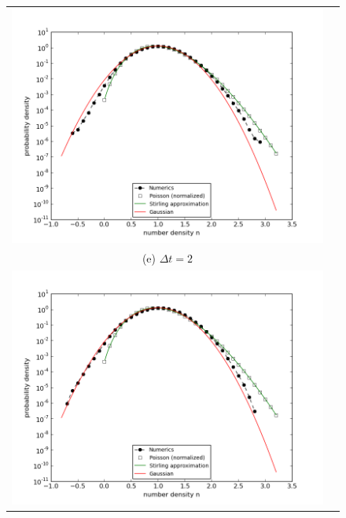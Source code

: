 \documentclass{article}
\begin{document}
\begin{figure}
\begin{tabular}{cc}
\includegraphics[width=0.5\linewidth]{fig1/3d_REACT_dt1_hist.png} \\ 
(e) $\Delta t=2$ & \\
\includegraphics[width=0.5\linewidth]{fig1/3d_REACT_dt2_hist.png} &
\end{tabular}
\caption{\label{fig_3d_REACT_hist}}
\end{figure}
\end{document}
